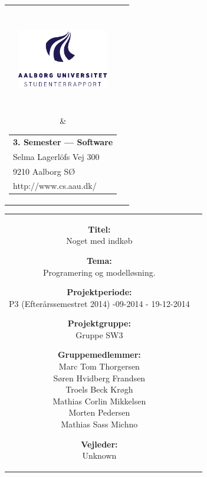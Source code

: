 \thispagestyle{empty}
\enlargethispage*{\ifcounts 4\else 2\fi\baselineskip}
{\samepage
\begin{tabular}{cc}
  \parbox{0.5\textwidth}{ %
    \hspace*{1cm} %
    \includegraphics[width=4cm,height=4cm,keepaspectratio]{images/aau_logo_da.pdf}} &
  \parbox{0.5\textwidth}{\begin{tabular}{l}
      {\small \textbf{3. Semester --- Software}}\\
      {\small Selma Lagerlöfs Vej 300} \\
      {\small 9210 Aalborg SØ} \\
      {\small http://www.cs.aau.dk/}
    \end{tabular}}
\end{tabular}

\begin{tabular}{cc}
  \parbox{8cm}{
  \begin{description}
    \item { \textbf{Titel:}}\\ 
      Noget med indkøb
    \item { \textbf{Tema:}}\\ 
      Programering og modelløsning. 
  \end{description}
  
  \parbox{8cm}{
  \begin{description}
    \item { \textbf{Projektperiode:}}\\
      P3 (Efterårssemestret 2014) -09-2014 - 19-12-2014
    \hspace{4cm}
    \item { \textbf{Projektgruppe:}}\\
        Gruppe SW3
    \hspace{4cm}
    \item {\textbf{Gruppemedlemmer:}}\\
      Marc Tom Thorgersen\\
      Søren Hvidberg Frandsen\\
      Troels Beck Krøgh\\
      Mathias Corlin Mikkelsen\\
      Morten Pedersen\\
      Mathias Sass Michno\\
    \hspace{2cm}
    \item { \textbf{Vejleder:}}\\
      Unknown\\
    \end{description}
  }

}
\end{tabular}}
